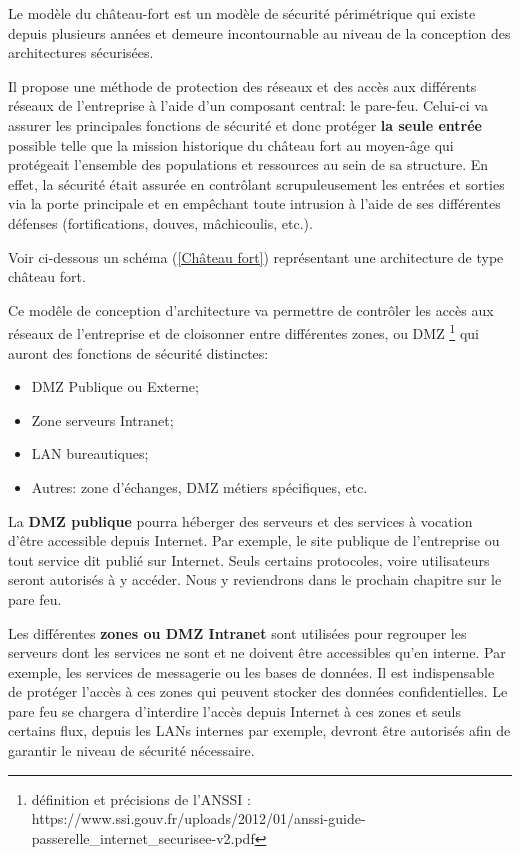 Le modèle du château-fort est un modèle de sécurité périmétrique qui existe depuis plusieurs années et demeure incontournable au niveau de la conception des architectures sécurisées. 

Il propose une méthode de protection des réseaux et des accès aux différents réseaux de l'entreprise à l'aide d'un composant central: le pare-feu. Celui-ci va assurer les principales fonctions de sécurité et donc protéger \textbf{la seule entrée} possible telle que la mission historique du château fort au moyen-âge qui protégeait l'ensemble des populations et ressources au sein de sa structure. En effet, la sécurité était assurée en contrôlant scrupuleusement les entrées et sorties via la porte principale et en empêchant toute intrusion à l'aide de ses différentes défenses (fortifications, douves, mâchicoulis, etc.).

Voir ci-dessous un schéma (\ref{Château fort}) représentant une architecture de type château fort.

Ce modêle de conception d'architecture va permettre de contrôler les accès aux réseaux de l'entreprise et de cloisonner entre différentes zones, ou DMZ \footnote{définition et précisions de l'ANSSI : https://www.ssi.gouv.fr/uploads/2012/01/anssi-guide-passerelle_internet_securisee-v2.pdf} qui auront des fonctions de sécurité distinctes:
\begin{itemize}
    \item DMZ Publique ou Externe;
    \item Zone serveurs Intranet;
    \item LAN bureautiques;
    \item Autres: zone d'échanges, DMZ métiers spécifiques, etc.
\end{itemize}

La \textbf{DMZ publique} pourra héberger des serveurs et des services à vocation d'être accessible depuis Internet. Par exemple, le site publique de l'entreprise ou tout service dit publié sur Internet. Seuls certains protocoles, voire utilisateurs seront autorisés à y accéder. Nous y reviendrons dans le prochain chapitre sur le pare feu.

Les différentes \textbf{zones ou DMZ Intranet} sont utilisées pour regrouper les serveurs dont les services ne sont et ne doivent être accessibles qu'en interne. Par exemple, les services de messagerie ou les bases de données. Il est indispensable de protéger l'accès à ces zones qui peuvent stocker des données confidentielles. Le pare feu se chargera d'interdire l'accès depuis Internet à ces zones et seuls certains flux, depuis les LANs internes par exemple, devront être autorisés afin de garantir le niveau de sécurité nécessaire.

